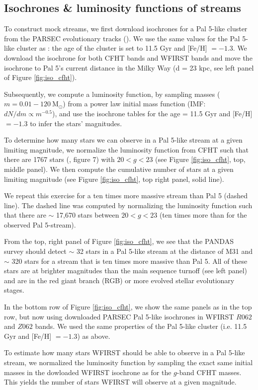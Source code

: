 \documentclass[twocolumn]{aastex62}
\newcommand{\msun}{\textrm{M}_\odot}
\begin{document}
\subsection{Isochrones \& luminosity functions of streams}
\label{sec:lum}
To construct mock streams, we first download isochrones for a Pal 5-like cluster from the PARSEC evolutionary tracks (\citealt{bressan12}). We use the same values for the Pal 5-like cluster as \citet{ibata17}: the age of the cluster is set to 11.5 Gyr and [Fe/H] $= -1.3$. We download the isochrone for both CFHT bands and WFIRST bands and move the isochrone to Pal 5's current distance in the Milky Way (d = 23 kpc, see left panel of Figure \ref{fig:iso_cfht}). 

Subsequently, we compute a luminosity function, by sampling masses ($m = 0.01 - 120 ~\msun$) from a power law initial mass function (IMF: $dN/dm \propto m^{-0.5}$), and use the isochrone tables for the age = 11.5 Gyr and [Fe/H] $= -1.3$ to infer the stars' magnitudes. 

To determine how many stars we can observe in a Pal 5-like stream at a given limiting magnitude, we normalize the luminosity function from CFHT such that there are 1767 stars (\citealt{ibata16}, figure 7) with $20 < g < 23$ (see Figure \ref{fig:iso_cfht}, top, middle panel). We then compute the cumulative number of stars at a given limiting magnitude (see Figure \ref{fig:iso_cfht}, top right panel, solid line).

We repeat this exercise for a ten times more massive stream than Pal 5 (dashed line). The dashed line was computed by normalizing the luminosity function such that there are $\sim$ 17,670 stars between $20 < g < 23$ (ten times more than for the observed Pal 5-stream). 

From the top, right panel of Figure \ref{fig:iso_cfht}, we see that the PANDAS survey should detect $\sim$ 32 stars in a Pal 5-like stream at the distance of M31 and $\sim$ 320 stars for a stream that is ten times more massive than Pal 5. All of these stars are at brighter magnitudes than the main sequence turnoff (see left panel) and are in the red giant branch (RGB) or more evolved stellar evolutionary stages. 

In the bottom row of Figure \ref{fig:iso_cfht}, we show the same panels as in the top row, but now using downloaded PARSEC Pal 5-like isochrones in WFIRST $R062$ and $Z062$ bands. We used the same properties of the Pal 5-like cluster (i.e. 11.5 Gyr and [Fe/H] $= -1.3$) as above. 

To estimate how many stars WFIRST should be able to observe in a Pal 5-like stream, we normalized the luminosity function by sampling the exact same initial masses in the dowloaded WFIRST isochrone as for the $g$-band CFHT masses. This yields the number of stars WFIRST will observe at a given magnitude. 
\end{document}
